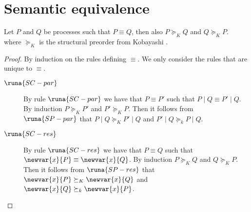 \chapter{Semantic equivalence}\label{app:languageequiv}
\setcounter{theorem}{1}

\begin{lemma}
Let $P$ and $Q$ be processes such that $P \equiv Q$, then also $P \succeq_K Q$ and $Q \succeq_K P$.\\

where $\succeq_{K}$ is the structural preorder from Kobayashi \cite{Kobayashi2000}.
\begin{proof} By induction on the rules defining $\equiv$. We only consider the rules that are unique to $\equiv$.
\begin{description}
    \item[$\runa{SC-par}$] By rule $\runa{SC-par}$ we have that $P \equiv P'$ such that $P \mid Q \equiv P' \mid Q$. By induction $P \succeq_K P'$ and $P' \succeq_K P$. Then it follows from $\runa{SP-par}$ that $P \mid Q \succeq_K P' \mid Q$ and $P' \mid Q \succeq_k P \mid Q$.
    
    \item[$\runa{SC-res}$] By rule $\runa{SC-res}$ we have that $P \equiv Q$ such that $\newvar{x}{P} \equiv \newvar{x}{Q}$. By induction $P \succeq_K Q$ and $Q \succeq_K P$. Then it follows from $\runa{SP-res}$ that $\newvar{x}{P} \succeq_K \newvar{x}{Q}$ and $\newvar{x}{Q} \succeq_k \newvar{x}{P}$.
\end{description}

\end{proof}%
\end{lemma}

